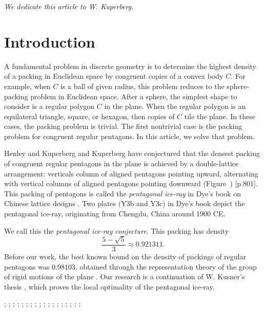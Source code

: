 \centerline{\it We dedicate this article to W. Kuperberg.}

\section{Introduction} %

A fundamental problem in discrete geometry is to determine the highest density of a packing
in Euclidean space by congruent copies of a convex body $C$.   For example, when $C$ is a ball
of given radius, this problem reduces to the sphere-packing problem in Euclidean space.
After a sphere, the simplest shape to consider is a regular polygon $C$ in the plane.
When the regular polygon is an equilateral triangle, square, or hexagon, then copies of $C$ tile
the plane.  In these cases, the packing problem is trivial.  The first nontrivial case
is the packing problem for congruent regular pentagons.  In this article, we solve that problem.

Henley and Kuperberg and Kuperberg have conjectured that the
densest packing of congruent regular pentagons in the plane is
achieved by a double-lattice arrangement: verticals column of aligned
pentagons pointing upward, alternating with vertical columns of
aligned pentagons pointing downward (Figure~) \cite{Kup} \cite{henley}[p.801].  
This packing of pentagons is called the {\it pentagonal ice-ray} in Dye's book on Chinese lattice designs \cite{dye}.
Two plates (Y3b and Y3c) in Dye's book depict the pentagonal ice-ray, originating from Chengdu, China around 1900 CE.

 We call this the {\it pentagonal ice-ray  conjecture}.
This packing has density
\[
\frac{5 - \sqrt{5}}3 \approx 0.921311.
\] %
Before our work, the best known bound on the density of packings of regular
pentagons was $0.98103$, obtained through the representation theory of the group of rigid motions of the plane \cite{Val}.
Our research is a continuation of W. Kusner's thesis \cite{Kus}, which proves
the local optimality of the pentagonal ice-ray.


{
;  %
;  %
;  
;  %
; 
;  
;  
;  %
; 
;  
;  
;  %
;  %
; 
;  %
; 
;  
;   
}



